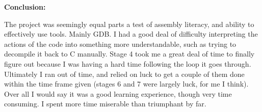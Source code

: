\documentclass{article}
\begin{document}
    \textbf{Conclusion:}

    The project was seemingly equal parts a test of assembly literacy, and ability to effectively use tools. Mainly GDB. I had a good deal of difficulty interpreting the actions of the code into something more understandable, such as trying to decompile it back to C manually. Stage 4 took me a great deal of time to finally figure out because I was having a hard time following the loop it goes through. Ultimately I ran out of time, and relied on luck to get a couple of them done within the time frame given (stages 6 and 7 were largely luck, for me I think).
    Over all I would say it was a good learning experience, though very time consuming. I spent more time miserable than triumphant by far.
\end{document}
